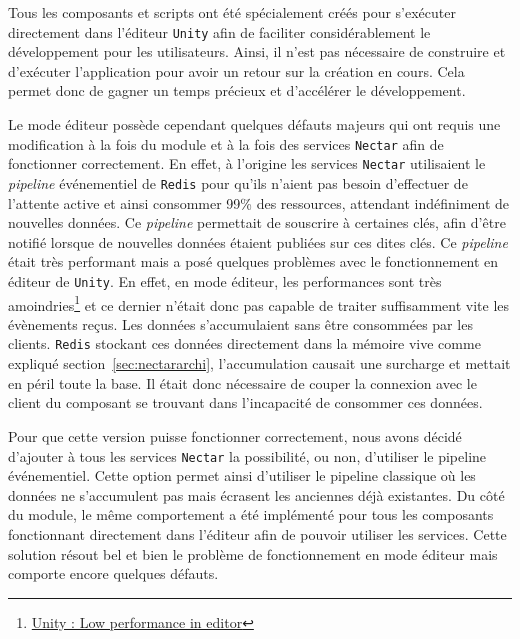 Tous les composants et scripts ont été spécialement créés pour s'exécuter directement dans l'éditeur \texttt{Unity} afin de faciliter considérablement le développement pour les utilisateurs. Ainsi, il n'est pas nécessaire de construire et d'exécuter l'application pour avoir un retour sur la création en cours. Cela permet donc de gagner un temps précieux et d'accélérer le développement.

Le mode éditeur possède cependant quelques défauts majeurs qui ont requis une modification à la fois du module et à la fois des services \texttt{Nectar} afin de fonctionner correctement. 
En effet, à l'origine les services \texttt{Nectar} utilisaient le \emph{pipeline} événementiel de \texttt{Redis} pour qu'ils n'aient pas besoin d'effectuer de l'attente active et ainsi consommer 99\% des ressources, attendant indéfiniment de nouvelles données. Ce \emph{pipeline} permettait de souscrire à certaines clés, afin d'être notifié lorsque de nouvelles données étaient publiées sur ces dites clés. Ce \emph{pipeline} était très performant mais a posé quelques problèmes avec le fonctionnement en éditeur de \texttt{Unity}. En effet, en mode éditeur, les performances sont très amoindries\footnote{\href{https://forum.unity.com/threads/low-performance-in-editor-but-working-fine-in-build.489030/}{Unity : Low performance in editor}} et ce dernier n'était donc pas capable de traiter suffisamment vite les évènements reçus. Les données s'accumulaient sans être consommées par les clients. \texttt{Redis} stockant ces données directement dans la mémoire vive comme expliqué section~\ref{sec:nectararchi}, l'accumulation causait une surcharge et mettait en péril toute la base. Il était donc nécessaire de couper la connexion avec le client du composant se trouvant dans l'incapacité de consommer ces données.

Pour que cette version puisse fonctionner correctement, nous avons décidé d'ajouter à tous les services \texttt{Nectar} la possibilité, ou non, d'utiliser le pipeline événementiel. Cette option permet ainsi d'utiliser le pipeline classique où les données ne s'accumulent pas mais écrasent les anciennes déjà existantes. Du côté du module, le même comportement a été implémenté pour tous les composants fonctionnant directement dans l'éditeur afin de pouvoir utiliser les services. Cette solution résout bel et bien le problème de fonctionnement en mode éditeur mais comporte encore quelques défauts.

